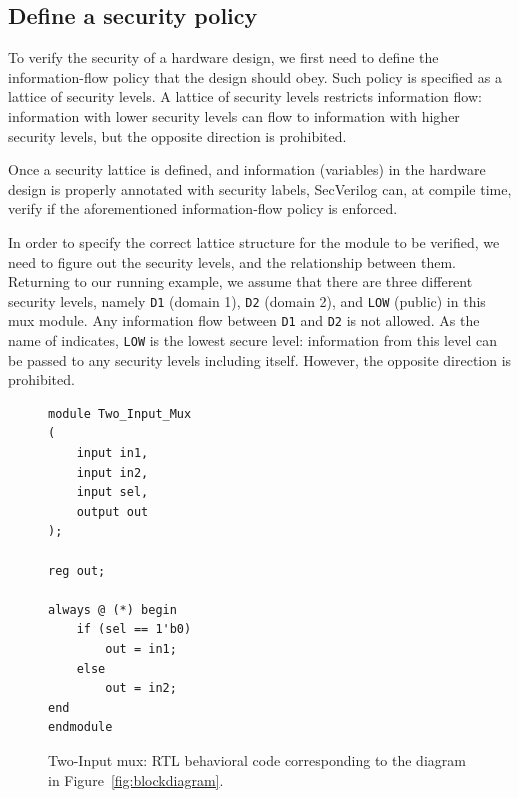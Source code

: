 \documentclass [12pt, oneside, a4paper]{article}
\newcommand{\code}[1]{\texttt{#1}}
\begin{document}
{%
\subsection{Define a security policy}

To verify the security of a hardware design, we first need to define the
information-flow policy that the design should obey. Such policy is specified
as a lattice of security levels. A lattice of security levels restricts
information flow: information with lower security levels can flow to
information with higher security levels, but the opposite direction is
prohibited. 

Once a security lattice is defined, and information (variables) in the
hardware design is properly annotated with security labels, SecVerilog
can, at compile time, verify if the aforementioned information-flow
policy is enforced.


In order to specify the correct lattice structure for the module to be
verified, we need to figure out the security levels, and the
relationship between them. Returning to our running example, we assume
that there are three
different security levels, namely \code{D1} (domain 1), \code{D2} (domain 2),
and \code{LOW} (public) in this mux module. Any information flow between
\code{D1} and \code{D2} is not allowed. As the name of
indicates, \code{LOW} is the lowest secure level: information from this
level can be passed to any security levels including itself. However,
the opposite direction is prohibited.

\begin{figure}
\centering
\begin{minipage}{.8\linewidth}
\begin{lstlisting}
module Two_Input_Mux
(
	input in1,
	input in2,
	input sel,
	output out
);

reg	out;

always @ (*) begin
	if (sel == 1'b0)
		out = in1;
	else
		out = in2;
end
endmodule
\end{lstlisting}
\end{minipage}
\caption{Two-Input mux: RTL behavioral code corresponding to the diagram in Figure~\ref{fig:blockdiagram}.}
\label{fig:twomux}
\end{figure}

}
\end{document}
